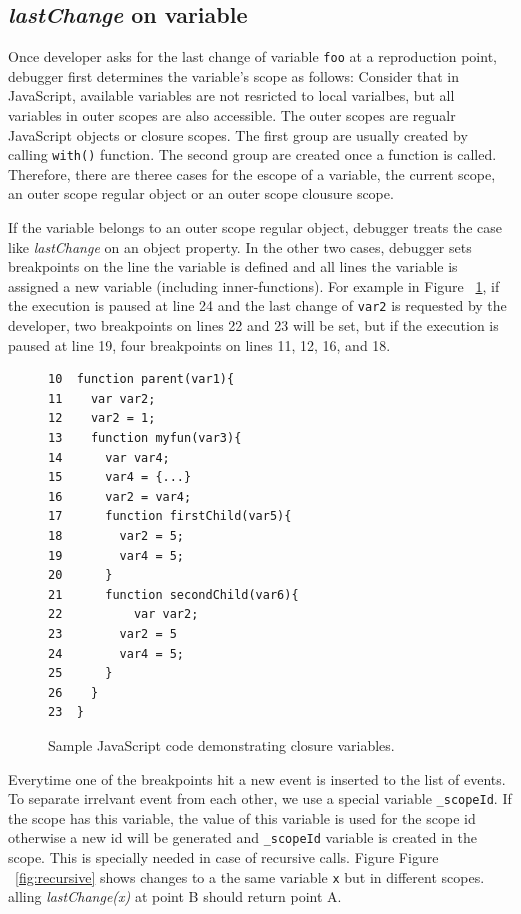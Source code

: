 \documentclass[preprint]{sigplanconf}
\begin{document}
\subsection{\textit{lastChange} on variable} 
Once developer asks for the last change of variable \texttt{foo} at a reproduction point, debugger first determines the variable's scope as follows:  Consider that in JavaScript, available variables are not resricted to local varialbes, but all variables in outer scopes are also accessible. The outer scopes are regualr JavaScript objects or closure scopes. The first group are usually created by calling \texttt{with()} function. The second group are created once a function is called. Therefore, there are theree cases for the escope of a variable, the current scope, an outer scope regular object or an outer scope clousure scope. 

If the variable belongs to an outer scope regular object, debugger treats the case like \textit{lastChange} on an object property. In the other two cases, debugger sets breakpoints on the line the variable is defined and all lines the variable is assigned a new variable (including inner-functions). For example in Figure ~\ref{fig:js-closure}, if the execution is paused at line 24 and the last change of \texttt{var2} is requested by the developer, two breakpoints on lines 22 and 23 will be set, but if the execution is paused at line 19, four breakpoints on lines 11, 12, 16, and 18.


\begin{figure}[htp]
\begin{verbatim}
10  function parent(var1){
11    var var2;
12    var2 = 1;
13    function myfun(var3){
14      var var4;
15      var4 = {...}
16      var2 = var4;
17      function firstChild(var5){
18        var2 = 5;
19        var4 = 5;
20      }  
21      function secondChild(var6){
22       	var var2;
23        var2 = 5			      
24        var4 = 5;	
25      }
26    }  
23  }    
\end{verbatim}
\caption{Sample JavaScript code demonstrating closure variables.}
\label{fig:js-closure}
\end{figure}


Everytime one of the breakpoints hit a new event is inserted to the list of events. To separate irrelvant event from each other, we use a special variable \texttt{\_scopeId}. If the scope has this variable, the value of this variable is used for the scope id otherwise a new id will be generated and \texttt{\_scopeId} variable is created in the scope. This is specially needed in case of recursive calls. Figure Figure ~\ref{fig:recursive} shows changes to a the same variable \texttt{x} but in different scopes. alling \textit{lastChange(x)} at point B should return point A.
\end{document}
